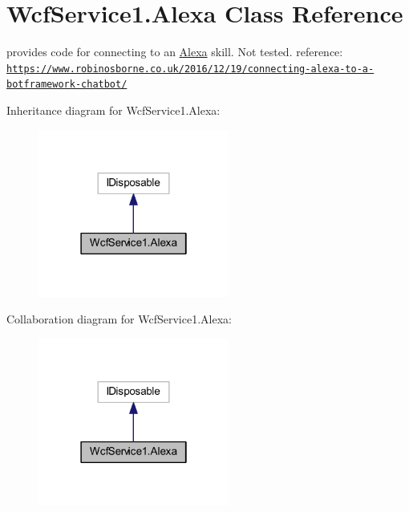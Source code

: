 \hypertarget{class_wcf_service1_1_1_alexa}{}\section{Wcf\+Service1.\+Alexa Class Reference}
\label{class_wcf_service1_1_1_alexa}


provides code for connecting to an \hyperlink{class_wcf_service1_1_1_alexa}{Alexa} skill. Not tested. reference\+: \href{https://www.robinosborne.co.uk/2016/12/19/connecting-alexa-to-a-botframework-chatbot/}{\tt https\+://www.\+robinosborne.\+co.\+uk/2016/12/19/connecting-\/alexa-\/to-\/a-\/botframework-\/chatbot/}  




Inheritance diagram for Wcf\+Service1.\+Alexa\+:\nopagebreak
\begin{figure}[H]
\begin{center}
\leavevmode
\includegraphics[width=178pt]{class_wcf_service1_1_1_alexa__inherit__graph}
\end{center}
\end{figure}


Collaboration diagram for Wcf\+Service1.\+Alexa\+:\nopagebreak
\begin{figure}[H]
\begin{center}
\leavevmode
\includegraphics[width=178pt]{class_wcf_service1_1_1_alexa__coll__graph}
\end{center}
\end{figure}
